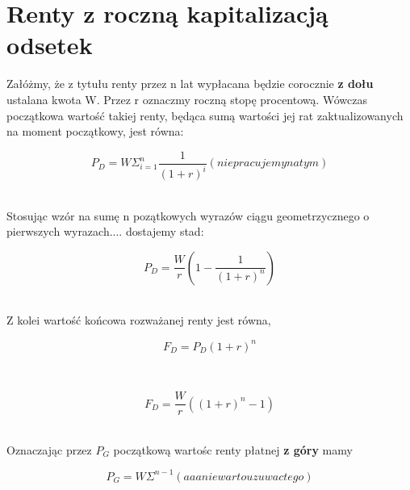 \documentclass{article}
\begin{document}
\newpage

\section{Renty z roczną kapitalizacją odsetek}

Załóżmy, że z tytułu renty przez n lat wypłacana będzie corocznie \textbf{z dołu} ustalana kwota W. Przez r oznaczmy roczną stopę procentową. Wówczas początkowa wartość takiej renty, będąca sumą wartości jej rat zaktualizowanych na moment początkowy, jest równa: 

\begin{center}
	\begin{equation}
		P_D = W \Sigma ^n_{i=1}\frac{1}{(1+r)^i} (nie pracujemy na tym)
	\end{equation}
\end{center}\\

Stosując wzór na sumę n pozątkowych wyrazów ciągu geometrzycznego o pierwszych wyrazach.... dostajemy stad:

\begin{center}
	\begin{equation}
		P_D = \frac{W}{r}(1 - \frac{1}{(1 + r)^n})
	\end{equation}
\end{center}\\

Z kolei wartość końcowa rozważanej renty jest równa,

\begin{center}
	\begin{equation}
		F_D = P_D(1 + r)^n
	\end{equation}
\end{center}\\

\begin{center}
	\begin{equation}
		F_D = \frac{W}{r}((1 + r)^n - 1)
	\end{equation}
\end{center}\\

Oznaczając przez $ P_G $ początkową wartośc renty płatnej \textbf{z góry} mamy

\begin{center}
	\begin{equation}
		P_G = W \Sigma ^{n-1} (aaa nie warto uzuwac tego)
	\end{equation}
\end{center}\\ 
\end{document}
